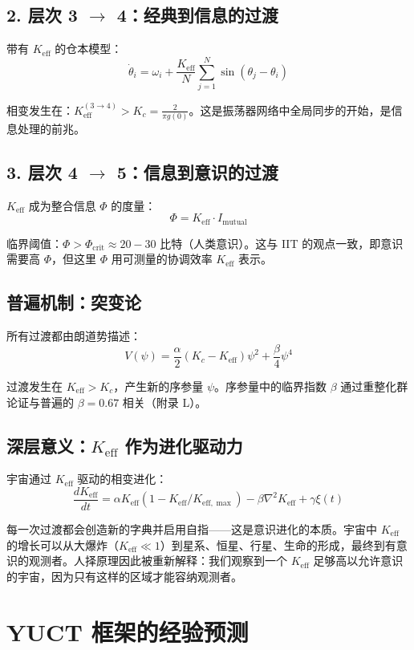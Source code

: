 \documentclass[12pt,a4paper]{article}
\newcommand{\eff}{\mathrm{eff}}
\newcommand{\Ke}{K_{\eff}}
\newcommand{\Kemax}{K_{\eff,\max}}
\begin{document}
	\subsection{2. 层次 3 $\to$ 4：经典到信息的过渡}
	
	带有 $\Ke$ 的仓本模型：
	\[
	\dot{\theta}_i = \omega_i + \frac{\Ke}{N}\sum_{j=1}^N \sin(\theta_j - \theta_i)
	\]
	
	相变发生在：$\Ke^{(3\to4)} > K_c = \frac{2}{\pi g(0)}$。这是振荡器网络中全局同步的开始，是信息处理的前兆。
	
	\subsection{3. 层次 4 $\to$ 5：信息到意识的过渡}
	
	$\Ke$ 成为整合信息 $\Phi$ 的度量：
	\[
	\Phi = \Ke \cdot I_{\text{mutual}}
	\]
	
	临界阈值：$\Phi > \Phi_{\text{crit}} \approx 20-30$ 比特（人类意识）。这与 IIT 的观点一致，即意识需要高 $\Phi$，但这里 $\Phi$ 用可测量的协调效率 $\Ke$ 表示。
	
	\subsection{普遍机制：突变论}
	
	所有过渡都由朗道势描述：
	\[
	V(\psi) = \frac{\alpha}{2}(K_c - \Ke)\psi^2 + \frac{\beta}{4}\psi^4
	\]
	
	过渡发生在 $\Ke > K_c$，产生新的序参量 $\psi$。序参量中的临界指数 $\beta$ 通过重整化群论证与普遍的 $\beta = 0.67$ 相关（附录 L）。
	
	\subsection{深层意义：$\Ke$ 作为进化驱动力}
	
	宇宙通过 $\Ke$ 驱动的相变进化：
	\[
	\frac{d\Ke}{dt} = \alpha \Ke(1 - \Ke/\Kemax) - \beta \nabla^2 \Ke + \gamma \xi(t)
	\]
	
	每一次过渡都会创造新的字典并启用自指——这是意识进化的本质。宇宙中 $\Ke$ 的增长可以从大爆炸（$\Ke \ll 1$）到星系、恒星、行星、生命的形成，最终到有意识的观测者。人择原理因此被重新解释：我们观察到一个 $\Ke$ 足够高以允许意识的宇宙，因为只有这样的区域才能容纳观测者。
	
	\section{YUCT 框架的经验预测}
	
\end{document}
